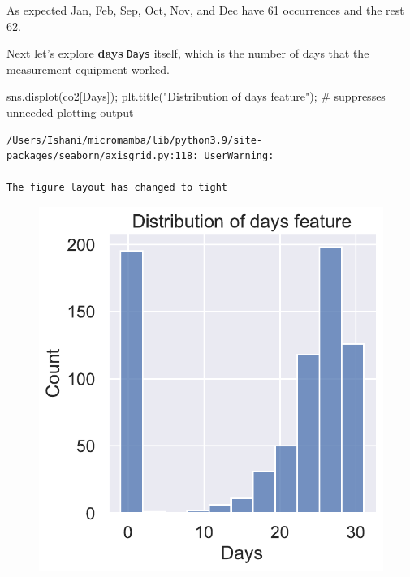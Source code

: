 \documentclass[
  letterpaper,
  DIV=11,
  numbers=noendperiod]{scrreprt}
\newenvironment{Shaded}{\begin{snugshade}}{\end{snugshade}}
\newcommand{\CommentTok}[1]{\textcolor[rgb]{0.37,0.37,0.37}{#1}}
\newcommand{\NormalTok}[1]{\textcolor[rgb]{0.00,0.23,0.31}{#1}}
\newcommand{\OperatorTok}[1]{\textcolor[rgb]{0.37,0.37,0.37}{#1}}
\newcommand{\StringTok}[1]{\textcolor[rgb]{0.13,0.47,0.30}{#1}}
\begin{document}
As expected Jan, Feb, Sep, Oct, Nov, and Dec have 61 occurrences and the
rest 62.

Next let's explore \textbf{days} \texttt{Days} itself, which is the
number of days that the measurement equipment worked.

\begin{Shaded}
\begin{Highlighting}[]
\NormalTok{sns.displot(co2[}\StringTok{\textquotesingle{}Days\textquotesingle{}}\NormalTok{])}\OperatorTok{;}
\NormalTok{plt.title(}\StringTok{"Distribution of days feature"}\NormalTok{)}\OperatorTok{;} \CommentTok{\# suppresses unneeded plotting output}
\end{Highlighting}
\end{Shaded}

\begin{verbatim}
/Users/Ishani/micromamba/lib/python3.9/site-packages/seaborn/axisgrid.py:118: UserWarning:

The figure layout has changed to tight
\end{verbatim}

\begin{figure}[H]

{\centering \includegraphics{eda/eda_files/figure-pdf/cell-67-output-2.pdf}

}

\end{figure}
\end{document}

